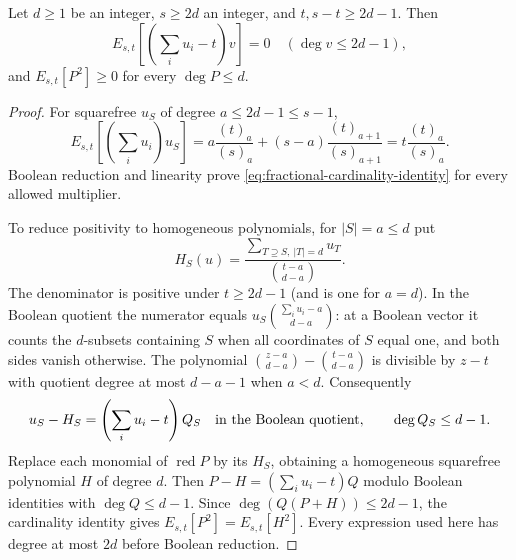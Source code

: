 \begin{lemma}
\label{lem:fractional-positive}
Let $d\ge1$ be an integer, $s\ge2d$ an integer, and
$t,s-t\ge2d-1$. Then
\begin{equation}\label{eq:fractional-cardinality-identity}
 E_{s,t}\left[\left(\sum_i u_i-t\right)v\right]=0
 \quad(\deg v\le2d-1),
\end{equation}
and $E_{s,t}[P^2]\ge0$ for every $\deg P\le d$.
\end{lemma}
\begin{proof}
For squarefree $u_S$ of degree $a\le2d-1\le s-1$,
\[
 E_{s,t}\left[\left(\sum_i u_i\right)u_S\right]
 =a\frac{(t)_a}{(s)_a}
  +(s-a)\frac{(t)_{a+1}}{(s)_{a+1}}
 =t\frac{(t)_a}{(s)_a}.
\]
Boolean reduction and linearity prove
\eqref{eq:fractional-cardinality-identity} for every allowed multiplier.

To reduce positivity to homogeneous polynomials, for $|S|=a\le d$ put
\begin{equation}\label{eq:fractional-homogenization}
 H_S(u)=\frac{\sum_{T\supseteq S,\ |T|=d}u_T}
                  {\binom{t-a}{d-a}}.
\end{equation}
The denominator is positive under $t\ge2d-1$ (and is one for $a=d$).
In the Boolean quotient the numerator equals
$u_S\binom{\sum_i u_i-a}{d-a}$: at a Boolean vector it counts the
$d$-subsets containing $S$ when all coordinates of $S$ equal one, and
both sides vanish otherwise. The polynomial
$\binom{z-a}{d-a}-\binom{t-a}{d-a}$ is divisible by $z-t$ with quotient
degree at most $d-a-1$ when $a<d$. Consequently
\[
 u_S-H_S=\left(\sum_i u_i-t\right)Q_S
 \quad\hbox{in the Boolean quotient},\qquad \deg Q_S\le d-1.
\]
Replace each monomial of $\operatorname{red}P$ by its $H_S$, obtaining a
homogeneous squarefree polynomial $H$ of degree $d$. Then
$P-H=(\sum_i u_i-t)Q$ modulo Boolean identities with $\deg Q\le d-1$.
Since $\deg(Q(P+H))\le2d-1$, the cardinality identity gives
$E_{s,t}[P^2]=E_{s,t}[H^2]$. Every expression used here has degree at most
$2d$ before Boolean reduction.


\end{proof}
